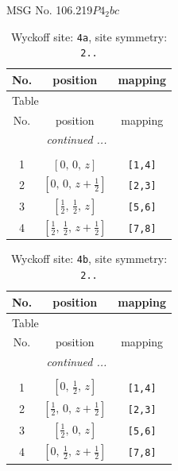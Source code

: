 \documentclass[fleqn,8pt]{jsarticle}
\begin{document}
\setcounter{MaxMatrixCols}{32}

\renewcommand{\tablename}{Table~}
\renewcommand{\figurename}{Figure~}
\begin{center}
\LARGE
MSG No. 106.219\quad$P4_{2}bc$
\end{center}
\renewcommand{\arraystretch}{1.2}
\begin{longtable}{ccc}
\caption{Wyckoff site: {\tt 4a}, site symmetry: {\tt 2..}}
 \\
 \hline \hline
No. & position & mapping \\ \hline \endfirsthead

\multicolumn{2}{l}{\tablename\ \thetable{}} \\
 \hline \hline
No. & position & mapping \\ \hline \endhead

 \hline \hline
\multicolumn{2}{r}{\footnotesize\it continued ...} \\ \endfoot

 \hline \hline
\multicolumn{2}{r}{} \\ \endlastfoot

1 & $\left[ 0,\, 0,\, z \right]$ & {\tt [1,4]} \\ \hline
2 & $\left[ 0,\, 0,\, z + \frac{1}{2} \right]$ & {\tt [2,3]} \\ \hline
3 & $\left[ \frac{1}{2},\, \frac{1}{2},\, z \right]$ & {\tt [5,6]} \\ \hline
4 & $\left[ \frac{1}{2},\, \frac{1}{2},\, z + \frac{1}{2} \right]$ & {\tt [7,8]} \\
\end{longtable}
\renewcommand{\arraystretch}{1.2}
\begin{longtable}{ccc}
\caption{Wyckoff site: {\tt 4b}, site symmetry: {\tt 2..}}
 \\
 \hline \hline
No. & position & mapping \\ \hline \endfirsthead

\multicolumn{2}{l}{\tablename\ \thetable{}} \\
 \hline \hline
No. & position & mapping \\ \hline \endhead

 \hline \hline
\multicolumn{2}{r}{\footnotesize\it continued ...} \\ \endfoot

 \hline \hline
\multicolumn{2}{r}{} \\ \endlastfoot

1 & $\left[ 0,\, \frac{1}{2},\, z \right]$ & {\tt [1,4]} \\ \hline
2 & $\left[ \frac{1}{2},\, 0,\, z + \frac{1}{2} \right]$ & {\tt [2,3]} \\ \hline
3 & $\left[ \frac{1}{2},\, 0,\, z \right]$ & {\tt [5,6]} \\ \hline
4 & $\left[ 0,\, \frac{1}{2},\, z + \frac{1}{2} \right]$ & {\tt [7,8]} \\
\end{longtable}
\end{document}
